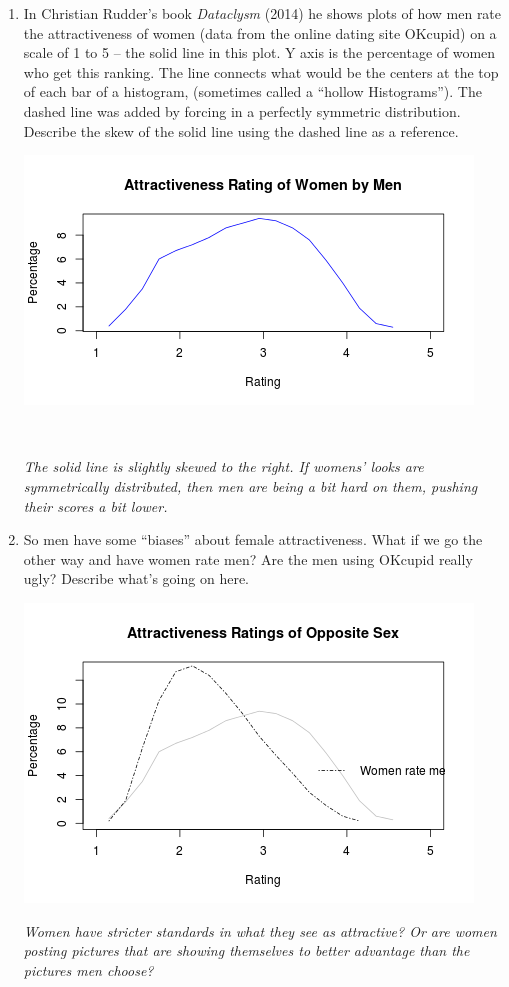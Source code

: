 \begin{enumerate}
\begin{enumerate}
\begin{key}
  {\it median and IQR -- due to skewness.}
\end{key}
    \end{enumerate}


  \item In Christian Rudder's book {\it Dataclysm} (2014) he shows
    plots of how men rate the attractiveness of women (data from the
    online dating site OKcupid) on a scale of 1 to 5 -- the solid line
    in this plot.  Y axis is the percentage of women who get this
    ranking. The line connects what would be the centers at the top of
    each bar of a histogram, (sometimes called a ``hollow
    Histograms'').  The dashed line was added by forcing in a
    perfectly symmetric distribution. Describe the skew of the solid
    line using the dashed line as a reference.


\includegraphics[width=.4\linewidth]{../plots/menRateWomen.png}

\begin{students}
   \   \vspace{2cm}    
\end{students}

\begin{key}
  {\it The solid line is slightly skewed to the right. If womens'
    looks are symmetrically distributed, then men are being a bit hard
  on them, pushing their scores a bit lower.}
\end{key}


\item So men have some ``biases'' about female attractiveness.  What
  if we go the other way and have women rate men?  Are the men using
  OKcupid really ugly?  Describe what's going on here.

 \includegraphics[width=.5\linewidth]{../plots/RateMenAndWomen.png}
\begin{students}
\vfill
\end{students}

\begin{key}
  {\it  Women have stricter standards in what they see as attractive?
     Or are women posting pictures that are showing themselves to
     better advantage than the pictures men choose?}
\end{key}
\end{enumerate}
  



